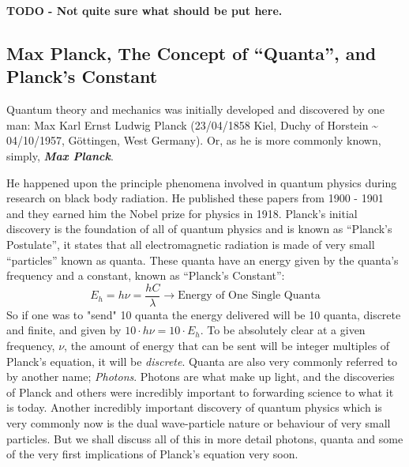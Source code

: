 \documentclass[../../Quantum-Technologies-Notes]{subfiles}
\begin{document}
			
			
			\vspace{15mm}
			
			\textbf{\LARGE\color{heading}TODO - Not quite sure what should be put here.} %
			
			\vspace{25mm}
		
		
		
		\subsection{Max Planck, The Concept of ``Quanta'', and Planck’s Constant}
			Quantum theory and mechanics was initially developed and discovered by one man: \linebreak 
			Max Karl Ernst Ludwig Planck {\fontsize{8}{9}\selectfont (23/04/1858 Kiel, Duchy of Horstein \~{} 04/10/1957, Göttingen, West Germany)}. Or, as he is more commonly known, simply, \textbf{\textit{Max Planck}}. \linebreak
			
			He happened upon the principle phenomena involved in quantum physics during research on black body radiation. He published these papers from 1900 - 1901 and they earned him the Nobel prize for physics in 1918. \linebreak
			Planck's initial discovery is the foundation of all of quantum physics and is known as ``Planck's Postulate'', it states that all electromagnetic radiation is made of very small ``particles'' known as quanta. These quanta have an energy given by the quanta's frequency and a constant, known as ``Planck's Constant'': \linebreak
			\begin{equation}
				E_h = \Planckconst \nu = \frac{\Planckconst C}{\lambda} \rightarrow \text{Energy of One Single Quanta}
			\end{equation} \linebreak
			So if one was to "send" 10 quanta the energy delivered will be 10 quanta, discrete and finite, and given by $10 \cdot \Planckconst\nu = 10\cdot E_h$. To be absolutely clear at a given frequency, $\nu$, the amount of energy that can be sent will be integer multiples of Planck's equation, it will be \textit{discrete}. \linebreak
			Quanta are also very commonly referred to by another name; \textit{Photons}. Photons are what make up light, and the discoveries of Planck and others were incredibly important to forwarding science to what it is today. Another incredibly important discovery of quantum physics which is very commonly now is the dual wave-particle nature or behaviour of very small particles. But we shall discuss all of this in more detail photons, quanta and some of the very first implications of Planck's equation very soon. \linebreak
		
\end{document}
